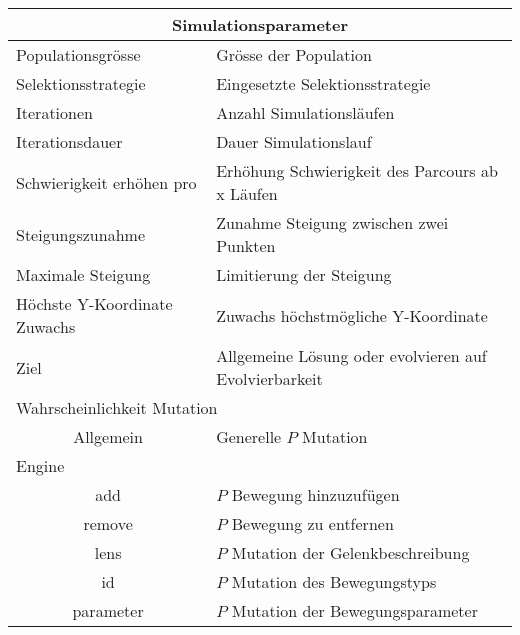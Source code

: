 
\begin{tabular}{ | p{} | p{} | }

  \hline
  \multicolumn{2}{|c|}{Simulationsparameter} \\
  \hline
  Populationsgrösse & Grösse der Population \\ \hline
  Selektionsstrategie & Eingesetzte Selektionsstrategie \\ \hline
  Iterationen & Anzahl Simulationsläufen \\ \hline
  Iterationsdauer & Dauer Simulationslauf \\ \hline
  Schwierigkeit erhöhen pro & Erhöhung Schwierigkeit des Parcours ab x Läufen \\ \hline
  Steigungszunahme & Zunahme Steigung zwischen zwei Punkten \\ \hline
  Maximale Steigung & Limitierung der Steigung\\ \hline
  Höchste Y-Koordinate Zuwachs & Zuwachs höchstmögliche Y-Koordinate \\ \hline
  Ziel & Allgemeine Lösung oder evolvieren auf Evolvierbarkeit \\ \hline
  \multicolumn{2}{|l|}{Wahrscheinlichkeit Mutation}\\ \hline
  \multicolumn{1}{|c|}{Allgemein} & Generelle \(P\) Mutation \\ \hline
  Engine &  \\ \hline
  \multicolumn{1}{|c|}{add} & \(P\) Bewegung hinzuzufügen \\ \hline
  \multicolumn{1}{|c|}{remove} & \(P\) Bewegung zu entfernen \\ \hline
  \multicolumn{1}{|c|}{lens} & \(P\) Mutation der Gelenkbeschreibung \\ \hline
  \multicolumn{1}{|c|}{id} & \(P\) Mutation des Bewegungstyps\\ \hline
  \multicolumn{1}{|c|}{parameter} & \(P\) Mutation der Bewegungsparameter \\ \hline

\end{tabular}
